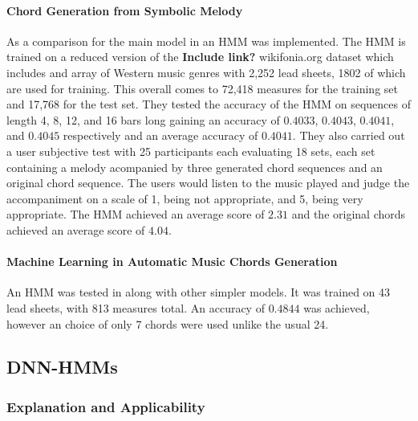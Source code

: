 \paragraph{Chord Generation from Symbolic Melody}  As a comparison for the main model in \cite{BLSTM} an HMM was implemented. 
The HMM is trained on a reduced version of the \textbf{Include link?} wikifonia.org dataset which includes and array of Western music genres with 2,252 lead sheets, 1802 of which are used for training. 
This overall comes to 72,418 measures for the training set and 17,768 for the test set. 
They tested the accuracy of the HMM on sequences of length 4, 8, 12, and 16 bars long gaining an accuracy of $0.4033$, $0.4043$, $0.4041$, and $0.4045$ respectively and an average accuracy of $0.4041$.
They also carried out a user subjective test with 25 participants each evaluating 18 sets, each set containing a melody acompanied by three generated chord sequences and an original chord sequence.
The users would listen to the music played and judge the accompaniment on a scale of 1, being not appropriate, and 5, being very appropriate.
The HMM achieved an average score of $2.31$ and the original chords achieved an average score of $4.04$.

\paragraph{Machine Learning in Automatic Music Chords Generation} An HMM was tested in \cite{MLForChords} along with other simpler models. It was trained on 43 lead sheets, with 813 measures total. 
An accuracy of $0.4844$ was achieved, however an choice of only 7 chords were used unlike the usual 24.


\subsection{DNN-HMMs}

\label{subsec:DNN-HMMs}
\subsubsection{Explanation and Applicability} 

